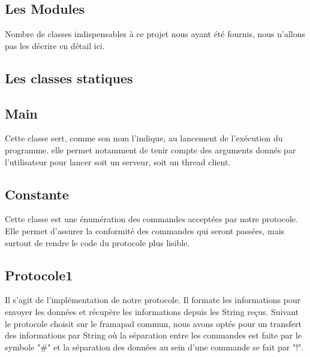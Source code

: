 \documentclass[a4paper, 12pt]{report}
\begin{document}
\begin{spacing}{1.3}
	
\textcolor{colortitre1}{\subsection*{Les Modules}}  








Nombre de classes indispensables à ce projet nous ayant été fournis, nous n'allons pas les décrire en détail ici.

	\textcolor{colortitre2}{\subsection*{Les classes statiques}}  
	
		\textcolor{colortitre3}{\subsection*{Main}}  
		
Cette classe sert, comme son nom l'indique, au lancement de l'exécution du programme. elle permet notamment de tenir compte des arguments donnés par l'utilisateur pour lancer soit un serveur, soit un thread client.
		
		\textcolor{colortitre3}{\subsection*{Constante}}  
Cette classe est une énumération des commandes acceptées par notre protocole. Elle permet d'assurer la conformité des commandes qui seront passées, mais surtout de rendre le code du protocole plus lisible.

		\textcolor{colortitre3}{\subsection*{Protocole1}}    
		
		Il s'agit de l'implémentation de notre protocole. Il formate les informations pour envoyer les données et récupère les informations depuis les String reçus. Suivant le protocole choisit sur le framapad commun, nous avons optés pour un transfert des informations par String où la séparation entre les commandes est faite par le symbole "\#" et la séparation des données au sein d'une commande se fait par "!".


\end{spacing}
\end{document}
